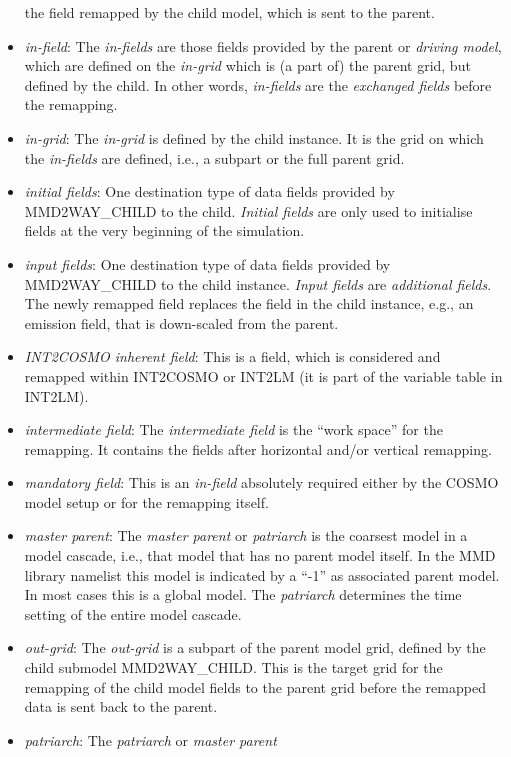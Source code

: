\documentclass[11pt,twoside]{article}
\begin{document}
\begin{appendix}
\begin{itemize}
  the field remapped by the child model, which is sent to the parent. 
\item {\it in-field}: The {\it in-fields} are those fields provided by 
  the parent or {\it driving model}, which are defined on the {\it
  in-grid} which is (a part of) the parent grid,
  but defined by the child. In other words, {\it in-fields} are the
  {\it exchanged fields} before the remapping.
\item {\it in-grid}: The {\it in-grid} is defined by the child
  instance. It is the grid on which
  the {\it in-fields} are defined, i.e., a subpart or the full parent grid.   
\item {\it initial fields}: One destination type of data fields provided by 
  MMD2WAY\_CHILD to the child. {\it Initial fields} are only used to
      initialise fields at the very beginning of the simulation.
\item {\it input fields}: One destination type of data fields provided by MMD2WAY\_CHILD to the
      child instance. {\it Input fields} are {\it additional fields}. The
      newly remapped field replaces the field in the child instance,
      e.g., an emission field, that is down-scaled from the parent.
\item {\it INT2COSMO inherent field}: This is a field, which is considered and
  remapped within INT2COSMO or INT2LM (it is part of the variable table in 
  INT2LM).
\item {\it intermediate field}: The {\it intermediate field} is the ``work
 space'' for the remapping. It contains the fields after horizontal and/or
  vertical remapping. 
\item {\it mandatory field}: This is an {\it in-field} absolutely 
  required either by the COSMO model setup or for the remapping itself.
\item {\it master parent}:  The {\it master parent} or {\it patriarch}
  is the coarsest model in a  model cascade, i.e., that model that has
  no parent model itself. In the MMD library 
namelist this model is indicated by a ``-1'' as associated parent model.
 In most cases this is a global model.  The {\it patriarch}
determines the time setting of the entire model cascade.
\item {\it out-grid}: The {\it out-grid} is a subpart of the parent model
  grid, defined by the child submodel MMD2WAY\_CHILD. This is the
  target grid for the remapping of the child model fields to the parent 
  grid before the remapped data is sent back to the parent. 
\item {\it patriarch}: The {\it patriarch} or {\it master parent} 

\end{itemize}
\end{appendix}
\end{document}
